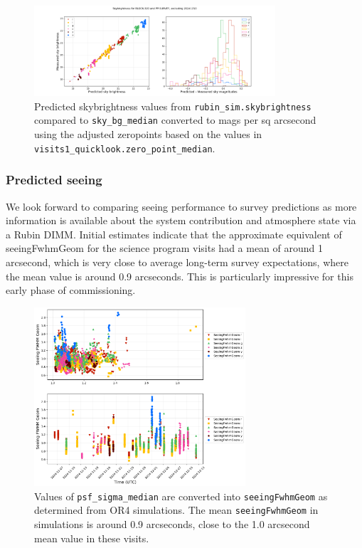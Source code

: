 \begin{figure}
    \centering
    \includegraphics[width=0.8\textwidth]{sp/sky.png}
    \caption{Predicted skybrightness values from \texttt{rubin\_sim.skybrightness} compared to
      \texttt{sky\_bg\_median} converted to mags per sq arcsecond  using the adjusted zeropoints based on the values in  \texttt{visits1\_quicklook.zero\_point\_median}.}
    \label{fig:sky}
    \end{figure}


\subsubsection{Predicted seeing}

We look forward to comparing seeing performance to survey predictions as more information is available about the system contribution and atmosphere state via a Rubin DIMM. Initial estimates indicate that the approximate equivalent of seeingFwhmGeom for the science program visits had a mean of around 1 arcsecond, which is very close to average long-term survey expectations, where the mean value is around 0.9 arcseconds. This is particularly impressive for this early phase of commissioning. 

\begin{figure}
    \centering
    \includegraphics[width=0.7\textwidth]{sp/seeing.png}
    \caption{Values of \texttt{psf\_sigma\_median} are converted into \texttt{seeingFwhmGeom} as determined from OR4 simulations. The mean \texttt{seeingFwhmGeom} in simulations is around 0.9 arcseconds, close to the 1.0 arcsecond mean value in these visits.}
    \label{fig:seeing}
    \end{figure}


